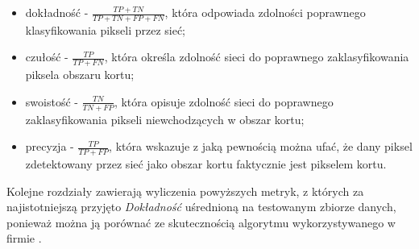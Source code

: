 \begin{itemize}
  \label{sec:miary}
  \item dokładność - $ \frac{TP + TN}{TP + TN + FP + FN} $, która odpowiada zdolności poprawnego klasyfikowania pikseli przez sieć;
  \item czułość - $ \frac{TP}{TP + FN} $, która określa zdolność sieci do poprawnego zaklasyfikowania piksela obszaru kortu;
  \item swoistość - $ \frac{TN}{TN + FP} $, która opisuje zdolność sieci do poprawnego zaklasyfikowania pikseli niewchodzących w obszar kortu; 
  \item precyzja - $ \frac{TP}{TP + FP} $, która wskazuje z jaką pewnością można ufać, że dany piksel zdetektowany przez sieć jako obszar kortu faktycznie jest pikselem kortu.
\end{itemize}

Kolejne rozdziały zawierają wyliczenia powyższych metryk, z których za najistotniejszą przyjęto \textit{Dokładność} uśrednioną na testowanym zbiorze danych, ponieważ można ją porównać ze skutecznością algorytmu wykorzystywanego w firmie \blue{}.
